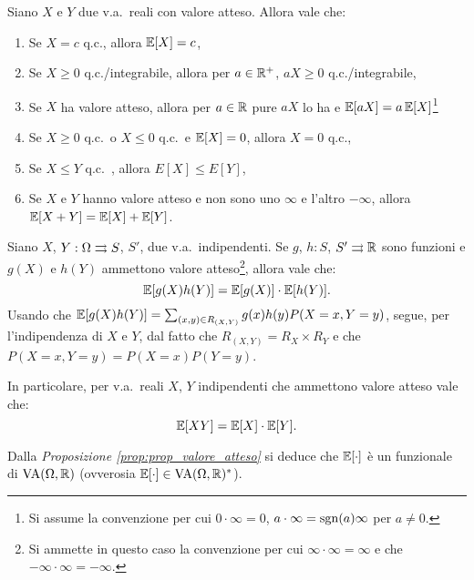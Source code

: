 \begin{multicols*}{2}
\begin{proposition}
    \label{prop:prop_valore_atteso}
    Siano $X$ e $Y$ due v.a.~reali con valore atteso. Allora vale che:
    \begin{enumerate}[(i.)]
        \item Se $X=c$ q.c., allora $\mathbb{E}[X] = c$,
        \item Se $X \geq 0$ q.c./integrabile, allora per $a \in \mathbb{R}^+$, $aX \geq 0$ q.c./integrabile,
        \item Se $X$ ha valore atteso, allora per $a \in \mathbb{R}$ pure $aX$ lo ha e $\mathbb{E}[aX] = a \, \mathbb{E}[X]$\footnote{
            Si assume la convenzione per cui $0 \cdot \infty = 0$, $a \cdot \infty = \operatorname{sgn}(a) \infty$ per
            $a \neq 0$.
        }
        \item Se $X \geq 0$ q.c.~o $X \leq 0$ q.c.~e $\mathbb{E}[X] = 0$, allora $X = 0$ q.c.,
        \item Se $X \leq Y$ q.c.~, allora $E[X] \leq E[Y]$,
        \item Se $X$ e $Y$ hanno valore atteso e non sono uno $\infty$ e l'altro
        $-\infty$, allora $\mathbb{E}[X + Y] = \mathbb{E}[X] + \mathbb{E}[Y]$.
    \end{enumerate}
\end{proposition}

\begin{proposition}
    Siano $X$, $Y : \Omega \rightrightarrows S$, $S'$, due v.a.~indipendenti. Se $g$, $h : S$, $S' \rightrightarrows \mathbb{R}$ sono funzioni e $g(X)$ e $h(Y)$ ammettono valore atteso\footnote{
        Si ammette in questo caso la convenzione per cui $\infty \cdot \infty = \infty$ e
        che $-\infty \cdot \infty = -\infty$.
    }, allora vale che:
    \[
        \mathbb{E}[g(X)h(Y)] = \mathbb{E}[g(X)] \cdot \mathbb{E}[h(Y)].
    \]
    Usando che $\mathbb{E}[g(X)h(Y)] = \sum_{(x, y) \in R_{(X, Y)}} g(x) h(y) P(X = x, Y = y)$, segue, per
    l'indipendenza di $X$ e $Y$, dal fatto che $R_{(X, Y)} = R_X \times R_Y$ e che $P(X = x, Y = y) = P(X = x) P(Y = y)$.
\end{proposition}

\begin{remark}
    \label{remark:indipendenza_valore_atteso}
    In particolare, per v.a.~reali $X$, $Y$ indipendenti che ammettono valore atteso
    vale che:
    \[
        \mathbb{E}[XY] = \mathbb{E}[X] \cdot \mathbb{E}[Y].
    \]
\end{remark}

\begin{remark}
    Dalla \textit{Proposizione \ref{prop:prop_valore_atteso}} si deduce che
    $\mathbb{E}[\cdot]$ è un funzionale di $\operatorname{VA}(\Omega, \mathbb{R})$ (ovverosia
    $\mathbb{E}[\cdot] \in \operatorname{VA}(\Omega, \mathbb{R})^*$).
\end{remark}


\end{multicols*}
